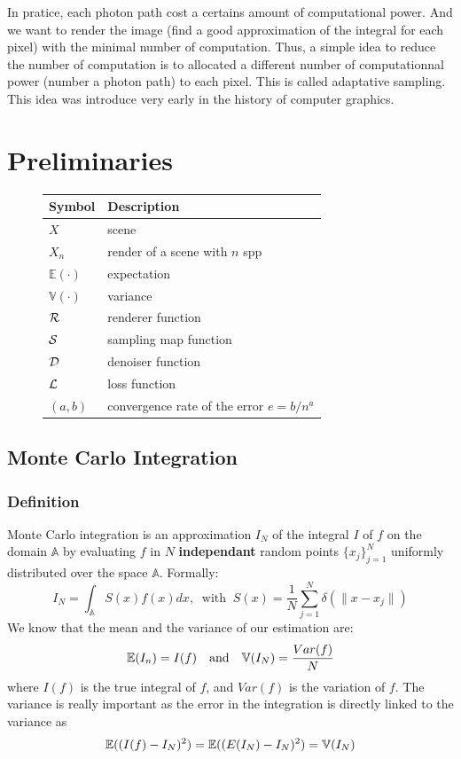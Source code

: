 \documentclass{classeENS}
\begin{document}
\par In pratice, each photon path cost a certains amount of computational power.
And we want to render the image (find a good approximation of the integral for each pixel) 
with the minimal number of computation. Thus, a simple idea to reduce the number of
computation is to allocated a different number of computationnal power (number a photon path)
to each pixel. This is called adaptative sampling. This idea was introduce very early in
the history of computer graphics.
\section{Preliminaries}

\begin{figure}[H]
    \centering
    \begin{tabular}{C{2cm} L{10cm}}
    \hline  
        Symbol & Description
    \tabularnewline 
    \hline
        $X$ & scene
    \tabularnewline
        $X_n$ & render of a scene with $n$ spp
    \tabularnewline
        $\mathbb E(\cdot)$ & expectation
    \tabularnewline
        $\mathbb V(\cdot)$ & variance
    \tabularnewline
        $\mathcal R$ & renderer function
    \tabularnewline
        $\mathcal S$ & sampling map function
    \tabularnewline
        $\mathcal D$ & denoiser function
    \tabularnewline
        $\mathcal L$ & loss function
    \tabularnewline
        $(a,b)$ & convergence rate of the error $e = b/n^a$
    \tabularnewline
    \hline 
    \end{tabular}
\end{figure}

\subsection{Monte Carlo Integration}

\subsubsection{Definition}\label{montecarlo}

Monte Carlo integration is an approximation $I_N$ of the integral 
$I$ of $f$ on the domain $\mathbb A$ by evaluating $f$ in $N$ \textbf{independant} 
random points $\{x_j\}_{j=1}^N$ uniformly distributed over the 
space $\mathbb A$. Formally:
\begin{equation}
    \label{eq:montecarlo}
    I_N = \int_{\mathbb A} S(x)f(x)dx, 
        \: \text{ with } \:
    S(x) = \frac{1}{N} \sum_{j=1}^N \delta(\lVert x-x_j \rVert)
\end{equation}
We know that the mean and the variance of our estimation are:
\begin{equation}
    \mathbb E(I_n) = I(f) \quad \text{and} \quad \mathbb V(I_N) = \frac{Var(f)}{N}
\end{equation}
where $I(f)$ is the true integral of $f$, and $Var(f)$ is the variation of $f$. 
The variance is really important as the error in the integration is directly 
linked to the variance as
\begin{align*}   \label{eq:variance}
    \mathbb E((I(f) - I_N)^2) = \mathbb E((E(I_N) - I_N)^2) = \mathbb V(I_N)
\end{align*}
\end{document}

